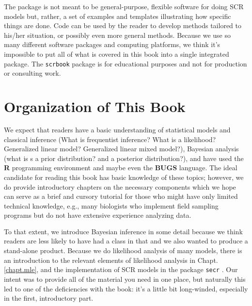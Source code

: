 The %
package is not meant to be general-purpose, %
flexible software for doing SCR models but, rather, a set of examples
and templates %
illustrating how specific things are done. Code can be used
by the reader to develop methods tailored to his/her situation, or
possibly even more general methods.  Because we use so many different
software packages and computing platforms, we think it's impossible to
put all of what is covered in this book into a single integrated
package.  The \mbox{\tt scrbook} package is for educational purposes
and not for production or consulting work.


\section*{Organization of This Book}

We expect that readers have a basic understanding of statistical
models and classical inference (What is frequentist inference? What is
a likelihood? Generalized linear model? Generalized linear mixed
model?), Bayesian analysis (what is s a prior distribution? and a
posterior distribution?), and have used the {\bf R} programming
environment and maybe even %
the \textbf{BUGS} language.  The ideal candidate for
reading this book has basic knowledge of these topics; however, we do
provide introductory chapters on the necessary components which we
hope can serve as a brief and cursory tutorial for those who might
have only limited technical knowledge, e.g., many biologists who
implement field sampling programs but do not have extensive experience
analyzing data.

To that extent, we introduce Bayesian inference in some detail because
we think readers are less likely to have had a class in that and we
also wanted to produce a stand-alone product.  Because we do
likelihood analysis of many models, there is an introduction to the
relevant elements of likelihood analysis in Chapt. \ref{chapt.mle},
and the implementation of SCR models in the package \mbox{\tt secr}
\citep{efford_etal:2009euring}.  
Our intent was to provide all of the
material you need in one place, but naturally this led to one of the
deficiencies with the book: it's a little bit long-winded, especially in the first, introductory part.

